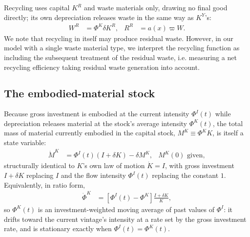  Recycling uses capital $K^R$ and waste materials only, drawing no final good directly; its own depreciation releases waste in the same way as $K^Y$'s:
\begin{align}
W^R &= \Phi^K\delta K^R, & R^R &= a\!\left(x\right)\varpi W.
\label{eq:sp:setup:recycling-mass}
\end{align}
We note that recycling in itself may produce residual waste. However, in our model with a single waste material type, we interpret the recycling function as including the subsequent treatment of the residual waste, i.e. measuring a net recycling efficiency taking residual waste generation into account. 

\subsection{The embodied-material stock}
\label{sec:sp:setup:embodied-stock}
Because gross investment is embodied at the current intensity $\Phi^I(t)$ while depreciation releases material at the stock's average intensity $\Phi^K(t)$, the total mass of material currently embodied in the capital stock, $M^K\equiv\Phi^KK$, is itself a state variable:
\begin{align}
\dot M^K &= \Phi^I(t)\left(I+\delta K\right)-\delta M^K,
&
M^K(0) \text{ given},
\label{eq:sp:setup:Phi-motion}
\end{align}
structurally identical to $K$'s own law of motion $\dot K=I$, with gross investment $I+\delta K$ replacing $I$ and the flow intensity $\Phi^I(t)$ replacing the constant $1$. Equivalently, in ratio form,
\begin{align}
\dot\Phi^K &= \left[\Phi^I(t)-\Phi^K\right]\frac{I+\delta K}{K},
\label{eq:sp:setup:phiK-motion}
\end{align}
so $\Phi^K(t)$ is an investment-weighted moving average of past values of $\Phi^I$: it drifts toward the current vintage's intensity at a rate set by the gross investment rate, and is stationary exactly when $\Phi^I(t)=\Phi^K(t)$.


